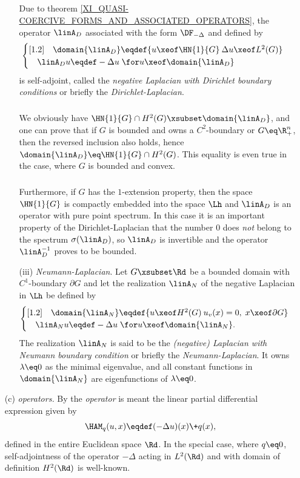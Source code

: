 \documentclass[11pt,twoside]{article}
\def\G{G}
\begin{document}
\begin{itemize}[leftmargin=17pt]
\begin{itemize}[leftmargin=5mm]
\subparagraph{}
Due to theorem \ref{XI_QUASI-COERCIVE_FORMS_AND_ASSOCIATED_OPERATORS},
the operator $\linA_D$ associated with the form $\DF_{-\Delta}$
and defined by
\[
\begin{cases}[1.2]
\quad \domain{\linA_D} \eqdef
\{u \xeof \HN{1}{\G} \: \Delta u \xeof L^2(\G)\} \\
\quad \linA_D u \eqdef - \Delta u \; \for u \xeof \domain{\linA_D} \\
\end{cases}
\] 
is self-adjoint,
called the \textit{negative Laplacian with Dirichlet boundary conditions}
or briefly the \textit{Dirichlet-Laplacian}.

\subparagraph{}
We obviously have
$\HN{1}{\G} \cap H^2(\G) \xsubset \domain{\linA_D}$,
and one can prove that
if $\G$ is bounded and owns a $C^2$-boundary or $\G \eq \R_+^n$,
then the reversed inclusion also holds,
hence $\domain{\linA_D} \eq \HN{1}{\G} \cap H^2(\G)$.
This equality is even true in the case,
where $\G$ is bounded and convex.

\subparagraph{}
Furthermore,
if $\G$ has the $1$-extension property,
then the space $\HN{1}{\G}$ is compactly embedded into the space $\Lh$
and $\linA_D$ is an operator with pure point spectrum.
In this case it is an important property of the Dirichlet-Laplacian
that the number $0$ does \textit{not} belong to the spectrum $\sigma(\linA_D)$,
so $\linA_D$ is invertible and the operator $\linA_D^{-1}$ proves to be bounded.

\item[(iii)]
\textit{Neumann-Laplacian}.
Let $\G \xsubset \Rd$ be a bounded domain with $C^1$-boundary $\partial \G$
and let the realization $\linA_N$ of the negative Laplacian in $\Lh$
be defined by
\[
\begin{cases}[1.2]
\quad \domain{\linA_N} \eqdef
\{ u \xeof H^2(\G) \: u_v(x)= 0, \; x \xeof \partial \G \} \\
\quad \linA_N u \eqdef - \Delta u \; \for u \xeof \domain{\linA_N}. \\
\end{cases}
\]
The realization $\linA_N$ is said to be the
\textit{(negative) Laplacian with Neumann boundary condition}
or briefly the \textit{Neumann-Laplacian}.
It owns $\lambda \eq 0$ as the minimal eigen\-value,
and all constant functions in $\domain{\linA_N}$ are eigen\-functions
of $\lambda \eq 0$.
\end{itemize}

\item[(c)] \textit{{\SCHROEDINGER} operators.}
By the \textit{{\SCHROEDINGER} operator} is meant
the linear partial differential expression given by
\[
\HAM_q(u,x) \eqdef (-\Delta u)(x) \+ q(x),
\]
defined in the entire Euclidean space $\Rd$.
In the special case,
where $q \eq 0$,
self-adjointness of the operator $-\Delta$ acting in $L^2(\Rd)$
and with domain of definition $H^2(\Rd)$ is well-known.


\end{itemize}
\end{document}
